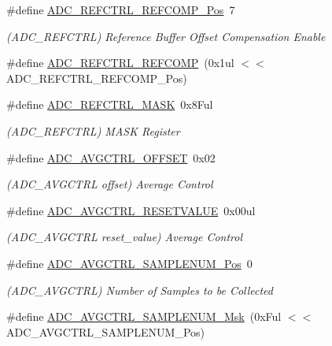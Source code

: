 \begin{DoxyCompactItemize}
\item 
\#define \mbox{\hyperlink{group___s_a_m_d21___a_d_c_gaecb97c00c286cfa030ba11dd4dc2d884}{A\+D\+C\+\_\+\+R\+E\+F\+C\+T\+R\+L\+\_\+\+R\+E\+F\+C\+O\+M\+P\+\_\+\+Pos}}~7
\begin{DoxyCompactList}\small\item\em (A\+D\+C\+\_\+\+R\+E\+F\+C\+T\+RL) Reference Buffer Offset Compensation Enable \end{DoxyCompactList}\item 
\#define \mbox{\hyperlink{group___s_a_m_d21___a_d_c_ga8d792ee4954ac03708bcb99ee68c2545}{A\+D\+C\+\_\+\+R\+E\+F\+C\+T\+R\+L\+\_\+\+R\+E\+F\+C\+O\+MP}}~(0x1ul $<$$<$ A\+D\+C\+\_\+\+R\+E\+F\+C\+T\+R\+L\+\_\+\+R\+E\+F\+C\+O\+M\+P\+\_\+\+Pos)
\item 
\#define \mbox{\hyperlink{group___s_a_m_d21___a_d_c_ga19614f4a34b63887b140f3e276c41d11}{A\+D\+C\+\_\+\+R\+E\+F\+C\+T\+R\+L\+\_\+\+M\+A\+SK}}~0x8\+Ful
\begin{DoxyCompactList}\small\item\em (A\+D\+C\+\_\+\+R\+E\+F\+C\+T\+RL) M\+A\+SK Register \end{DoxyCompactList}\item 
\#define \mbox{\hyperlink{group___s_a_m_d21___a_d_c_ga360fdef32b21cb1a277faa31db6996fd}{A\+D\+C\+\_\+\+A\+V\+G\+C\+T\+R\+L\+\_\+\+O\+F\+F\+S\+ET}}~0x02
\begin{DoxyCompactList}\small\item\em (A\+D\+C\+\_\+\+A\+V\+G\+C\+T\+RL offset) Average Control \end{DoxyCompactList}\item 
\#define \mbox{\hyperlink{group___s_a_m_d21___a_d_c_ga8bf6910b7cb768949d87054bef54fc89}{A\+D\+C\+\_\+\+A\+V\+G\+C\+T\+R\+L\+\_\+\+R\+E\+S\+E\+T\+V\+A\+L\+UE}}~0x00ul
\begin{DoxyCompactList}\small\item\em (A\+D\+C\+\_\+\+A\+V\+G\+C\+T\+RL reset\+\_\+value) Average Control \end{DoxyCompactList}\item 
\#define \mbox{\hyperlink{group___s_a_m_d21___a_d_c_gae24ef894295278762f9293105f06ffb9}{A\+D\+C\+\_\+\+A\+V\+G\+C\+T\+R\+L\+\_\+\+S\+A\+M\+P\+L\+E\+N\+U\+M\+\_\+\+Pos}}~0
\begin{DoxyCompactList}\small\item\em (A\+D\+C\+\_\+\+A\+V\+G\+C\+T\+RL) Number of Samples to be Collected \end{DoxyCompactList}\item 
\#define \mbox{\hyperlink{group___s_a_m_d21___a_d_c_ga10a4df299fe2d9a69e31fd85e120ea4e}{A\+D\+C\+\_\+\+A\+V\+G\+C\+T\+R\+L\+\_\+\+S\+A\+M\+P\+L\+E\+N\+U\+M\+\_\+\+Msk}}~(0x\+Ful $<$$<$ A\+D\+C\+\_\+\+A\+V\+G\+C\+T\+R\+L\+\_\+\+S\+A\+M\+P\+L\+E\+N\+U\+M\+\_\+\+Pos)

\end{DoxyCompactItemize}
